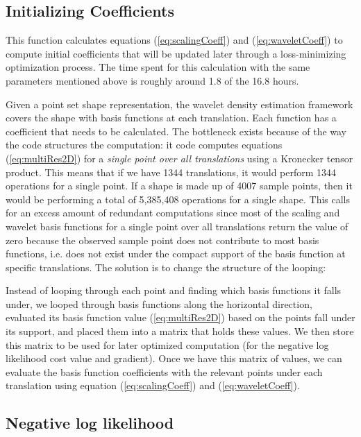 \documentclass[../tech_report_1.tex]{subfiles}
\begin{document}
\subsection{Initializing Coefficients}

This function calculates equations (\ref{eq:scalingCoeff})
and (\ref{eq:waveletCoeff}) to compute initial coefficients
that will be updated later through a loss-minimizing optimization process.
The time spent for this calculation with the same parameters mentioned
above is roughly around 1.8 of the 16.8 hours. 

Given a point set shape representation, the wavelet density estimation framework covers the
shape with basis functions at each translation. Each function has
a coefficient that needs to be calculated. The bottleneck exists because of the way the code structures the computation: it
code computes equations (\ref{eq:multiRes2D}) for a \emph{single
point over all translations} using a Kronecker
tensor product.  \cite{van2000ubiquitous}
 This means that if we have 1344 translations,
it would perform 1344 operations for a single point. If a shape is made up of 4007 sample
points, then it would be performing a total of 5,385,408 operations
for a single shape. This calls for an excess amount of redundant computations
since most of the scaling and wavelet basis functions for a single
point over all translations return the value of zero because the observed sample point does not contribute
to most basis functions, i.e. does not exist under the compact support
of the basis function at specific translations. The solution is to change the structure of the looping: 

Instead of looping through each point and finding which basis functions
it falls under, we looped through basis functions along the horizontal
direction, evaluated its basis function value (\ref{eq:multiRes2D})
based on the points fall under its support, and placed them into a
matrix that holds these values. We then store this matrix to be used
for later optimized computation (for the negative log likelihood cost
value and gradient). Once we have this matrix of values, we can evaluate the basis function coefficients with the relevant points
under each translation using equation (\ref{eq:scalingCoeff}) and
(\ref{eq:waveletCoeff}). 


\subsection{Negative log likelihood}
\end{document}
